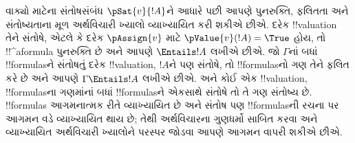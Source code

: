 \documentclass[../../../include/open-logic-section]{subfiles}
\begin{document}
વાક્યો માટેના સંતોષસંબંધ $\pSat{v}{!A}$ને આધારે પછી આપણે પુનરુક્તિ,
ફલિતતા અને સંતોષ્યતાના મૂળ અર્થવિચારી ખ્યાલો વ્યાખ્યાયિત કરી શકીએ
છીએ. દરેક !!{valuation} તેને સંતોષે, એટલે કે દરેક $\pAssign{v}$ માટે
$\pValue{v}(!A)=\True$ હોય, તો !!^a{formula} પુનરુક્તિ છે અને આપણે
$\Entails !A$ લખીએ છીએ. જો $\Gamma$નાં બધાં !!{formula}sને સંતોષતું
દરેક !!{valuation}, $!A$ને પણ સંતોષે, તો !!{formula}sનો ગણ તેને
ફલિત કરે છે અને આપણે $\Gamma\Entails !A$ લખીએ છીએ. અને કોઈ એક
!!{valuation}, !!{formula}sના ગણમાંનાં બધાં !!{formula}sને એકસાથે સંતોષે તો
તે ગણ સંતોષ્ય છે. !!{formula}s આગમનાત્મક રીતે વ્યાખ્યાયિત છે અને
સંતોષ પણ !!{formula}sની રચના પર આગમન વડે વ્યાખ્યાયિત થાય છે; તેથી
અર્થવિચારના ગુણધર્મો સાબિત કરવા અને વ્યાખ્યાયિત અર્થવિચારી ખ્યાલોને
પરસ્પર જોડવા આપણે આગમન વાપરી શકીએ છીએ.
\end{document}
